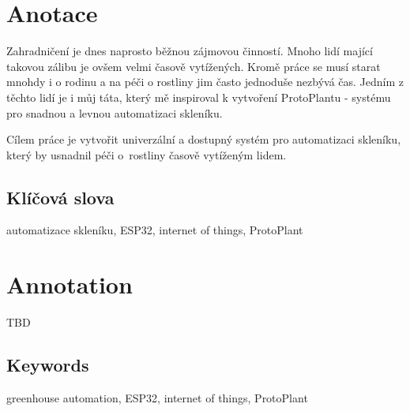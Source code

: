 \documentclass{template/socthesis}
\author{Petr Štourač}
\begin{document}
\maketitle



\pagestyle{empty}

\section*{Anotace}
Zahradničení je dnes naprosto běžnou zájmovou činností. Mnoho lidí mající takovou zálibu je ovšem velmi časově vytížených. Kromě práce se musí starat mnohdy i o rodinu a na péči o rostliny jim často jednoduše nezbývá čas. Jedním z těchto lidí je i můj táta, který mě inspiroval k vytvoření ProtoPlantu - systému pro snadnou a levnou automatizaci skleníku. 

Cílem práce je vytvořit univerzální a dostupný systém pro automatizaci skleníku, který by usnadnil péči o~rostliny časově vytíženým lidem. 

\subsection*{Klíčová slova}
automatizace skleníku, ESP32, internet of things, ProtoPlant 

\vspace{20mm}

\section*{Annotation}
TBD

\subsection*{Keywords}
greenhouse automation, ESP32, internet of things, ProtoPlant

\newpage
\pagestyle{plain}

\tableofcontents %

\setcounter{figure}{0}
\setcounter{table}{0}
\newpage





\printbibliography[title=Literatura]

\listoffigures
{}

\listoftables
{}

\listoflistedequation
{}
\end{document}
